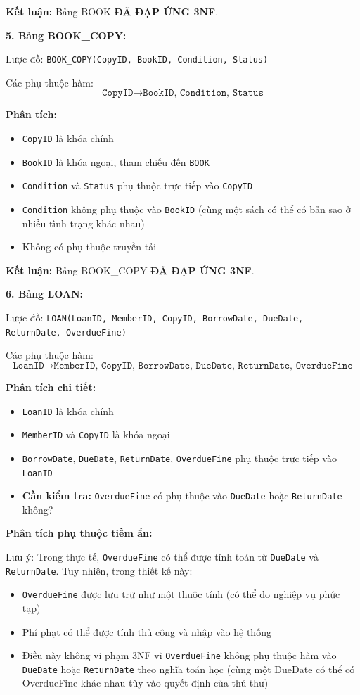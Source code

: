 \documentclass[12pt,a4paper]{article}
\begin{document}
\textbf{Kết luận:} Bảng BOOK \textbf{ĐÃ ĐẠP ỨNG 3NF}.

\vspace{0.3cm}

\textbf{5. Bảng BOOK\_COPY:}

Lược đồ: \texttt{BOOK\_COPY(CopyID, BookID, Condition, Status)}

Các phụ thuộc hàm:
$$ \texttt{CopyID} \rightarrow \texttt{BookID, Condition, Status} $$

\textbf{Phân tích:}
\begin{itemize}
    \item \texttt{CopyID} là khóa chính
    \item \texttt{BookID} là khóa ngoại, tham chiếu đến \texttt{BOOK}
    \item \texttt{Condition} và \texttt{Status} phụ thuộc trực tiếp vào \texttt{CopyID}
    \item \texttt{Condition} không phụ thuộc vào \texttt{BookID} (cùng một sách có thể có bản sao ở nhiều tình trạng khác nhau)
    \item Không có phụ thuộc truyền tải
\end{itemize}

\textbf{Kết luận:} Bảng BOOK\_COPY \textbf{ĐÃ ĐẠP ỨNG 3NF}.

\vspace{0.3cm}

\textbf{6. Bảng LOAN:}

Lược đồ: \texttt{LOAN(LoanID, MemberID, CopyID, BorrowDate, DueDate, ReturnDate, OverdueFine)}

Các phụ thuộc hàm:
$$ \texttt{LoanID} \rightarrow \texttt{MemberID, CopyID, BorrowDate, DueDate, ReturnDate, OverdueFine} $$

\textbf{Phân tích chi tiết:}
\begin{itemize}
    \item \texttt{LoanID} là khóa chính
    \item \texttt{MemberID} và \texttt{CopyID} là khóa ngoại
    \item \texttt{BorrowDate}, \texttt{DueDate}, \texttt{ReturnDate}, \texttt{OverdueFine} phụ thuộc trực tiếp vào \texttt{LoanID}
    \item \textbf{Cần kiểm tra:} \texttt{OverdueFine} có phụ thuộc vào \texttt{DueDate} hoặc \texttt{ReturnDate} không?
\end{itemize}

\textbf{Phân tích phụ thuộc tiềm ẩn:}

Lưu ý: Trong thực tế, \texttt{OverdueFine} có thể được tính toán từ \texttt{DueDate} và \texttt{ReturnDate}. Tuy nhiên, trong thiết kế này:
\begin{itemize}
    \item \texttt{OverdueFine} được lưu trữ như một thuộc tính (có thể do nghiệp vụ phức tạp)
    \item Phí phạt có thể được tính thủ công và nhập vào hệ thống
    \item Điều này không vi phạm 3NF vì \texttt{OverdueFine} không phụ thuộc hàm vào \texttt{DueDate} hoặc \texttt{ReturnDate} theo nghĩa toán học (cùng một DueDate có thể có OverdueFine khác nhau tùy vào quyết định của thủ thư)
\end{itemize}
\end{document}
